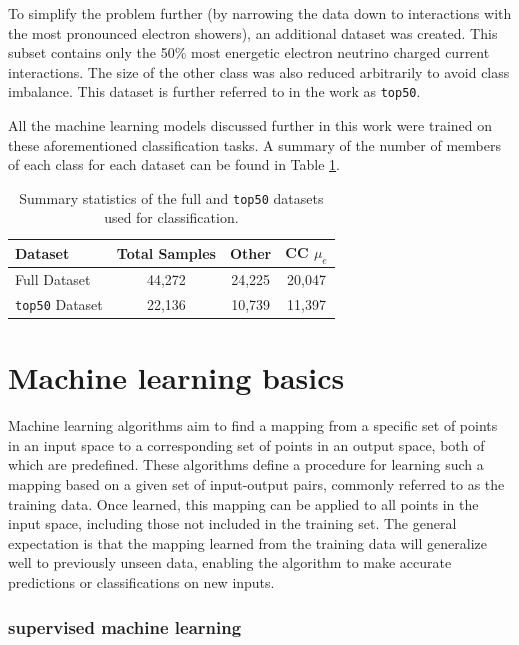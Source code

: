 \documentclass{pracalicmgr}
\begin{document}
To simplify the problem further (by narrowing the data down to interactions with the most pronounced electron showers), an additional dataset was created. This subset contains only the 50\% most energetic electron neutrino charged current interactions. The size of the other class was also reduced arbitrarily to avoid class imbalance. This dataset is further referred to in the work as \texttt{top50}.

All the machine learning models discussed further in this work were trained on these aforementioned classification tasks. A summary of the number of members of each class for each dataset can be found in Table \ref{tab:dataset_stats}.


\begin{table}[h]
    \centering
    \caption{Summary statistics of the full and \texttt{top50} datasets used for classification.}
    \label{tab:dataset_stats}
    \begin{tabular}{lccc}
        \toprule
        \textbf{Dataset} & \textbf{Total Samples} & \textbf{Other} & \textbf{CC $\mu_e$ } \\
        \midrule
        Full Dataset     & 44,272                 & 24,225 & 20,047 \\
        \texttt{top50} Dataset & 22,136                 & 10,739 & 11,397 \\
        \bottomrule
    \end{tabular}
\end{table}

\chapter{Machine learning basics}

Machine learning algorithms aim to find a mapping from a specific set of points in an input space to a corresponding set of points in an output space, both of which are predefined. These algorithms define a procedure for learning such a mapping based on a given set of input-output pairs, commonly referred to as the training data. Once learned, this mapping can be applied to all points in the input space, including those not included in the training set. The general expectation is that the mapping learned from the training data will generalize well to previously unseen data, enabling the algorithm to make accurate predictions or classifications on new inputs.

\subsection{supervised machine learning}
\end{document}
